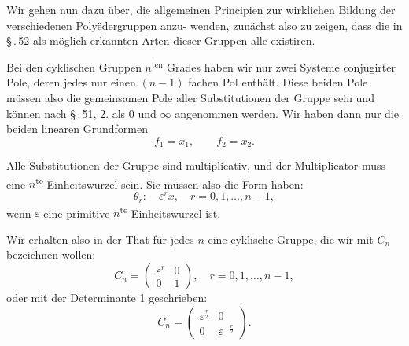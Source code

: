 \documentclass[12pt,a4paper]{article}
\theoremstyle{plain}
\theoremstyle{definition}
\theoremstyle{remark}
\begin{document}
Wir gehen nun dazu \"uber, die allgemeinen Principien zur
wirklichen Bildung der verschiedenen Poly\"edergruppen anzu-
wenden, zun\"achst also zu zeigen, dass die in \S\,.\,52 als m\"oglich
erkannten Arten dieser Gruppen alle existiren.

Bei den cyklischen Gruppen $n^{\text{ten}}$ Grades haben wir nur zwei
Systeme conjugirter Pole, deren jedes nur einen $(n-1)$ fachen
Pol enth\"alt. Diese beiden Pole m\"ussen also die gemeinsamen
Pole aller Substitutionen der Gruppe sein und k\"onnen nach
\S\,.\,51, 2. als $0$ und $\infty$ angenommen werden. Wir haben dann
nur die beiden linearen Grundformen
\begin{equation}\label{eq:55_1}
f_1 = x_1,\qquad f_2 = x_2.\tag{1}
\end{equation}

Alle Substitutionen der Gruppe sind multiplicativ, und der
Multiplicator muss eine $n$\textsuperscript{te} Einheitswurzel sein. Sie m\"ussen also
die Form haben:
\begin{equation}\label{eq:55_2}
\theta_r:\quad \varepsilon^r x,\quad r = 0, 1, \ldots, n-1,\tag{2}
\end{equation}
wenn $\varepsilon$ eine primitive $n$\textsuperscript{te} Einheitswurzel ist.

Wir erhalten also in der That f\"ur jedes $n$ eine cyklische
Gruppe, die wir mit $C_n$ bezeichnen wollen:
\begin{equation}\label{eq:55_3}
C_n = \begin{pmatrix}\varepsilon^r & 0\\ 0 & 1\end{pmatrix},\quad r = 0, 1, \ldots, n-1,\tag{3}
\end{equation}
oder mit der Determinante 1 geschrieben:
\begin{equation}\label{eq:55_4}
C_n = \begin{pmatrix}\varepsilon^{\frac{r}{2}} & 0\\ 0 & \varepsilon^{-\frac{r}{2}}\end{pmatrix}.\tag{4}
\end{equation}
\end{document}
